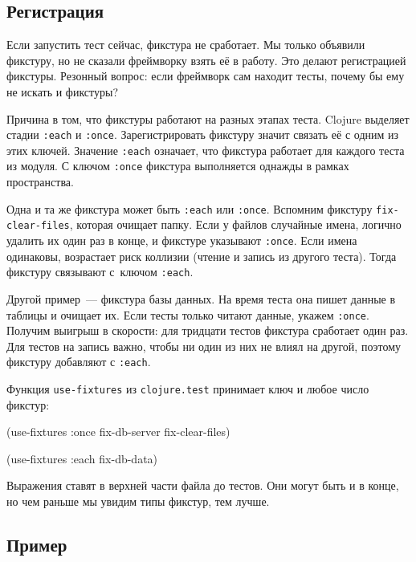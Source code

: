 \subsection{Регистрация}


Если запустить тест сейчас, фикстура не сработает. Мы только объявили фикстуру,
но не сказали фреймворку взять её в работу. Это делают регистрацией фикстуры.
Резонный вопрос: если фреймворк сам находит тесты, почему бы ему не искать и
фикстуры?

Причина в том, что фикстуры работают на разных этапах теста. Clojure выделяет
стадии \verb|:each| и \verb|:once|. Зарегистрировать фикстуру значит связать
её с одним из этих ключей. Значение \verb|:each| означает, что фикстура
работает для каждого теста из модуля. С ключом \verb|:once| фикстура
выполняется однажды в рамках пространства.


Одна и та же фикстура может быть \verb|:each| или \verb|:once|. Вспомним
фикстуру \verb|fix-clear-files|, которая очищает папку. Если у файлов случайные
имена, логично удалить их один раз в конце, и фикстуре указывают
\verb|:once|. Если имена одинаковы, возрастает риск коллизии (чтение и запись из
другого теста). Тогда фикстуру связывают с~ключом \verb|:each|.

Другой пример~--- фикстура базы данных. На время теста она пишет данные в
таблицы и очищает их. Если тесты только читают данные, укажем
\verb|:once|. Получим выигрыш в скорости: для тридцати тестов фикстура
сработает один раз. Для тестов на запись важно, чтобы ни один из них не влиял на
другой, поэтому фикстуру добавляют с \verb|:each|.

Функция \verb|use-fixtures| из \verb|clojure.test| принимает ключ и любое
число фикстур:


\begin{english}
  \begin{clojure}
(use-fixtures :once
  fix-db-server fix-clear-files)

(use-fixtures :each fix-db-data)
  \end{clojure}
\end{english}

Выражения ставят в верхней части файла до тестов. Они могут быть и в конце, но
чем раньше мы увидим типы фикстур, тем лучше.

\subsection{Пример}

